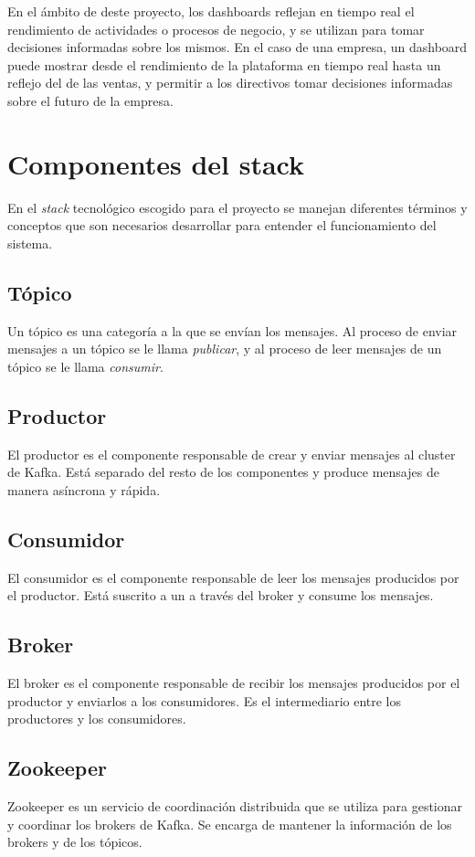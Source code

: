 En el ámbito de deste proyecto, los dashboards reflejan en tiempo real el rendimiento de
actividades o procesos de negocio, y se utilizan para tomar decisiones informadas sobre los
mismos. En el caso de una empresa, un dashboard puede mostrar desde el rendimiento de la
plataforma en tiempo real hasta un reflejo del de las ventas, y permitir a los directivos tomar
decisiones informadas sobre el futuro de la empresa.

\section{Componentes del stack}\label{sec:componentes}
En el \textit{stack} tecnológico escogido para el proyecto se manejan
diferentes términos y conceptos que son necesarios desarrollar para
entender el funcionamiento del sistema.

\subsection{Tópico}\label{subsec:topico}
Un tópico es una categoría a la que se envían los mensajes. Al proceso de enviar mensajes a
un tópico se le llama \emph{publicar}, y al proceso de leer mensajes de un tópico se le llama
\emph{consumir}.

\subsection{Productor}\label{subsec:productor}
El productor es el componente responsable de crear y enviar mensajes al cluster de Kafka.
Está separado del resto de los componentes y produce mensajes de manera asíncrona y rápida.

\subsection{Consumidor}\label{subsec:consumidor}
El consumidor es el componente responsable de leer los mensajes producidos por el productor.
Está suscrito a un  a través del broker y consume los mensajes.

\subsection{Broker}\label{subsec:broker}
El broker es el componente responsable de recibir los mensajes producidos por el productor y
enviarlos a los consumidores. Es el intermediario entre los productores y los consumidores.

\subsection{Zookeeper}\label{subsec:zookeeper}
Zookeeper es un servicio de coordinación distribuida que se utiliza para gestionar y coordinar
los brokers de Kafka. Se encarga de mantener la información de los brokers y de los tópicos.
